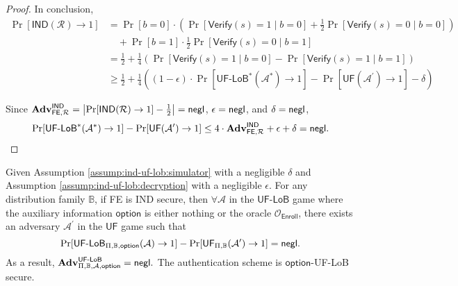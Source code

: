 \begin{proof}
In conclusion,
\begin{align*}
	\Pr[\textsf{IND}(\mathcal{R}) \to 1] 
	&= \Pr[b = 0] \cdot \left( \Pr[\textsf{Verify}(s) = 1 \mid b = 0] + \frac{1}{2} \Pr[\textsf{Verify}(s) = 0 \mid b = 0] \right) \\
	&\quad + \Pr[b = 1] \cdot \frac{1}{2} \Pr[\textsf{Verify}(s) = 0 \mid b = 1] \\
	&= \frac{1}{2} + \frac{1}{4} \left( \Pr[\textsf{Verify}(s) = 1 \mid b = 0] - \Pr[\textsf{Verify}(s) = 1 \mid b = 1] \right) \\
	&\geq \frac{1}{2} + \frac{1}{4} \left( (1-\epsilon) \cdot \Pr[\textsf{UF-LoB}^*(\mathcal{A}^*) \to 1] - \Pr[\textsf{UF}(\mathcal{A}^\prime) \to 1] - \delta \right)
\end{align*}

\noindent Since $\mathbf{Adv}_{\textsf{FE}, \mathcal{R}}^\textsf{IND} = \left| \Pr[\textsf{IND}(\mathcal{R}) \to 1] - \frac{1}{2} \right| = \mathsf{negl}$, $\epsilon = \mathsf{negl}$, and $\delta = \mathsf{negl}$,
\[
	\Pr[\textsf{UF-LoB}^*(\mathcal{A}^*) \to 1] - \Pr[\textsf{UF}(\mathcal{A}^\prime) \to 1] \leq 4 \cdot \mathbf{Adv}_{\textsf{FE}, \mathcal{R}}^\textsf{IND} + \epsilon + \delta = \mathsf{negl}.
\]

\end{proof}

\begin{corollary}
Given Assumption \ref{assump:ind-uf-lob:simulator} with a negligible $\delta$ and Assumption \ref{assump:ind-uf-lob:decryption} with a negligible $\epsilon$.
	For any distribution family $\mathbb{B}$, if \textsf{FE} is IND secure, then $\forall \mathcal{A}$ in the $\textsf{UF-LoB}$ game where the auxiliary information $\textsf{option}$ is either nothing or the oracle $\mathcal{O}_{\textsf{Enroll}}$, there exists an adversary $\mathcal{A}^\prime$ in the $\textsf{UF}$ game such that
\[
	\Pr[\textsf{UF-LoB}_{\Pi, \mathbb{B}, \textsf{option}}(\mathcal{A}) \to 1] - \Pr[\textsf{UF}_{\Pi, \mathbb{B}}(\mathcal{A}^\prime) \to 1] = \mathsf{negl}.
\]
As a result, $\mathbf{Adv}_{\Pi, \mathbb{B}, \mathcal{A}, \textsf{option}}^{\textsf{UF-LoB}} = \mathsf{negl}.$ The authentication scheme is $\textsf{option}$-UF-LoB secure.	

\end{corollary}


